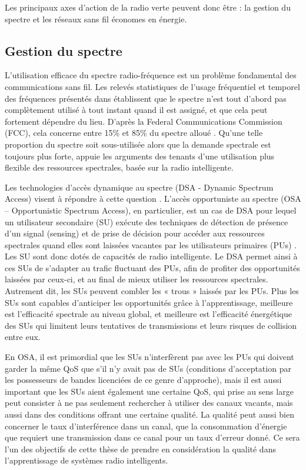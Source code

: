 Les principaux axes d’action de la radio verte peuvent donc être : la gestion du spectre et les réseaux sans fil économes en énergie.

\subsection*{Gestion du spectre}

L’utilisation efficace du spectre radio-fréquence est un problème fondamental des communications sans fil. Les relevés statistiques de l’usage fréquentiel et temporel des fréquences présentés dans \cite{Fed_2002, Palicot_2013} établissent que le spectre n’est tout d’abord pas complètement utilisé à tout instant quand il est assigné, et que cela peut fortement dépendre du lieu. D’après la Federal Communications Commission (FCC), cela concerne entre 15\% et 85\% du spectre alloué \cite{FCC_2003}. Qu’une telle proportion du spectre soit sous-utilisée alors que la demande spectrale est toujours plus forte, appuie les arguments des tenants d’une utilisation plus flexible des ressources spectrales, basée sur la radio intelligente.

Les technologies d’accès dynamique au spectre (DSA - Dynamic Spectrum Access) visent à répondre à cette question \cite{QZhao_2007}. L’accès opportuniste au spectre (OSA – Opportunistic Spectrum Access), en particulier, est un cas de DSA pour lequel un utilisateur secondaire (SU) exécute des techniques de détection de présence d’un signal (sensing) et de prise de décision pour accéder aux ressources spectrales quand elles sont laissées vacantes par les utilisateurs primaires (PUs) \cite{Wassim_2010, Grace_2012}. Les SU sont donc dotés de capacités de radio intelligente. Le DSA permet ainsi à ces SUs de s’adapter au trafic fluctuant des PUs, afin de profiter des opportunités laissées par ceux-ci, et au final de mieux utiliser les ressources spectrales. Autrement dit, les SUs peuvent combler les « trous » laissés par les PUs. Plus les SUs sont capables d’anticiper les opportunités grâce à l’apprentissage, meilleure est l’efficacité spectrale au niveau global, et meilleure est l’efficacité énergétique des SUs qui limitent leurs tentatives de transmissions et leurs risques de collision entre eux. 

En OSA, il est primordial que les SUs n’interfèrent pas avec les PUs qui doivent garder la même QoS que s’il n’y avait pas de SUs (conditions d’acceptation par les possesseurs de bandes licenciées de ce genre d’approche), mais il est aussi important que les SUs aient également une certaine QoS, qui prise au sens large peut consister à ne pas seulement rechercher à utiliser des canaux vacants, mais aussi dans des conditions offrant une certaine qualité. La qualité peut aussi bien concerner le taux d’interférence dans un canal, que la consommation d’énergie que requiert une transmission dans ce canal pour un taux d’erreur donné. Ce sera l’un des objectifs de cette thèse de prendre en considération la qualité dans l’apprentissage de systèmes radio intelligents.



